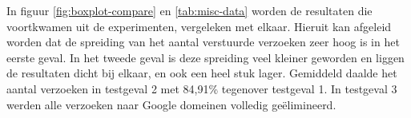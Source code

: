 In figuur \ref{fig:boxplot-compare} en \ref{tab:misc-data} worden de resultaten die voortkwamen uit de experimenten, vergeleken met elkaar. Hieruit kan afgeleid worden dat de spreiding van het aantal verstuurde verzoeken zeer hoog is in het eerste geval. In het tweede geval is deze spreiding veel kleiner geworden en liggen de resultaten dicht bij elkaar, en ook een heel stuk lager. Gemiddeld daalde het aantal verzoeken in testgeval 2 met 84,91\% tegenover testgeval 1. In testgeval 3 werden alle verzoeken naar Google domeinen volledig geëlimineerd.
